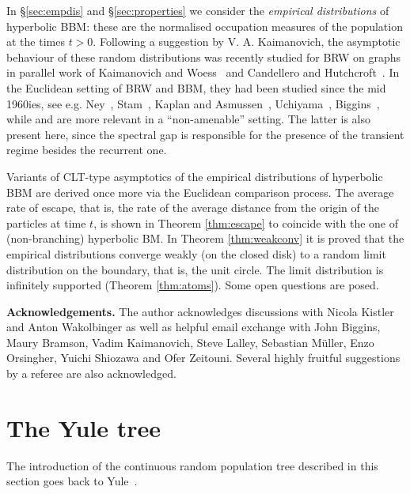 \documentclass[12pt]{amsart}
\numberwithin{theorem}{section}
\theoremstyle{definition}
\begin{document}
In \S \ref{sec:empdis} and \S\ref{sec:properties} we consider the \emph{empirical distributions} of
hyperbolic BBM: these are the normalised 
occupation measures of the population at the times $t > 0$. 
Following a suggestion by V. A. Kaimanovich, the asymptotic behaviour of these random distributions
was recently studied for BRW on graphs in parallel work of {\sc Kaimanovich and Woess}~\cite{KW}
and {\sc Candellero and Hutchcroft}~\cite{CH}. In the Euclidean setting of BRW and BBM, they had 
been studied since the mid 1960ies, see e.g. {\sc Ney}~\cite{Ney},  {\sc Stam}~\cite{St}, 
{\sc Kaplan and Asmussen}~\cite{KA}, {\sc Uchiyama}~\cite{U}, {\sc Biggins}~\cite{Bi1}, 
while \cite{KW}
and \cite{CH} are more relevant in a ``non-amenable'' setting. The latter is also present here, since
the spectral gap is responsible for the presence of the transient regime besides the recurrent one.

Variants of CLT-type asymptotics of the empirical distributions of hyperbolic BBM are 
derived once more via the Euclidean comparison process. The average rate of escape, that 
is, the rate of the average distance from the origin 
of the particles at time $t$, is shown in Theorem \ref{thm:escape} to coincide with the 
one of (non-branching) hyperbolic BM. In Theorem \ref{thm:weakconv} it is proved that 
the empirical distributions converge weakly
(on the closed disk) to a random limit distribution on the boundary, that is, the unit circle.
The limit distribution is infinitely supported (Theorem \ref{thm:atoms}). 
Some open questions are posed.

\smallskip

\noindent 
{\bf Acknowledgements.} The author acknowledges discussions with Nicola Kistler and Anton Wakolbinger
as well as helpful email exchange with John Biggins, Maury Bramson, Vadim Kaimanovich, 
Steve Lalley,  Sebastian M\"uller, Enzo Orsingher, Yuichi Shiozawa and Ofer Zeitouni. Several 
highly fruitful suggestions by a referee are also acknowledged.
%



\section{The Yule tree}\label{sec:yule}

The introduction of the continuous random population tree described in this section goes back to
{\sc Yule}~\cite{Y}.
\end{document}
